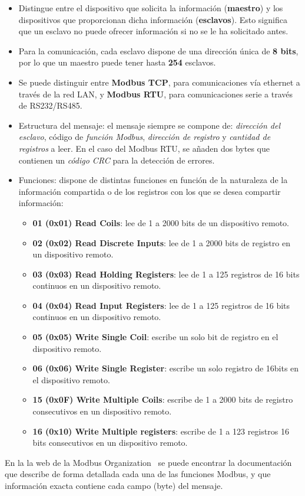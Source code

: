 \begin{itemize}
  \item Distingue entre el dispositivo que solicita la información (\textbf{maestro}) y los dispositivos que proporcionan dicha información (\textbf{esclavos}). Esto significa que un esclavo no puede ofrecer información si no se le ha solicitado antes.  
  \item Para la comunicación, cada esclavo dispone de una dirección única de \textbf{8 bits}, por lo que un maestro puede tener hasta \textbf{254} esclavos.
  \item Se puede distinguir entre \textbf{Modbus TCP}, para comunicaciones vía ethernet a través de la red LAN, y \textbf{Modbus RTU}, para comunicaciones serie a través de RS232/RS485.
  \item Estructura del mensaje: el mensaje siempre se compone de: \textit{dirección del esclavo}, código de \textit{función Modbus}, \textit{dirección de registro} y \textit{cantidad de registros} a leer. En el caso del Modbus RTU, se añaden dos bytes que contienen un \textit{código CRC} para la detección de errores.
  \item Funciones: dispone de distintas funciones en función de la naturaleza de la información compartida o de los registros con los que se desea compartir información:
  \begin{itemize}
    \item \textbf{01 (0x01) Read Coils}: lee de 1 a 2000 bits de un dispositivo remoto.
    \item \textbf{02 (0x02) Read Discrete Inputs}: lee de 1 a 2000 bits de registro en un dispositivo remoto.
    \item \textbf{03 (0x03) Read Holding Registers}: lee de 1 a 125 registros de 16 bits continuos en un dispositivo remoto.
    \item \textbf{04 (0x04) Read Input Registers}: lee de 1 a 125 registros de 16 bits continuos en un dispositivo remoto.
    \item \textbf{05 (0x05) Write Single Coil}: escribe un solo bit de registro en el dispositivo remoto.
    \item \textbf{06 (0x06) Write Single Register}: escribe un solo registro de 16bits en el dispositivo remoto.
    \item \textbf{15 (0x0F) Write Multiple Coils}: escribe de 1 a 2000 bits de registro consecutivos en un dispositivo remoto.
    \item \textbf{16 (0x10) Write Multiple registers}: escribe de 1 a 123 registros 16 bits consecutivos en un dispositivo remoto.
  \end{itemize}  
\end{itemize} 

En la la web de la Modbus Organization~\cite{modbusorg} se puede encontrar la documentación que describe de forma detallada cada una de las funciones Modbus, y que información exacta contiene cada campo (byte) del mensaje.


